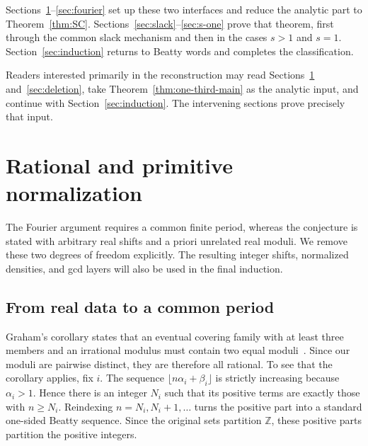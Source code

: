 \documentclass[11pt]{article}
\theoremstyle{definition}
\theoremstyle{remark}
\newcommand{\Z}{\mathbb Z}
\begin{document}
Sections~\ref{sec:normalization}--\ref{sec:fourier} set up these two
interfaces and reduce the analytic part to Theorem~\ref{thm:SC}.
Sections~\ref{sec:slack}--\ref{sec:s-one} prove that theorem, first through
the common slack mechanism and then in the cases \(s>1\) and \(s=1\).
Section~\ref{sec:induction} returns to Beatty words and completes the
classification.

Readers interested primarily in the reconstruction may read
Sections~\ref{sec:normalization} and~\ref{sec:deletion}, take
Theorem~\ref{thm:one-third-main} as the analytic input, and continue with
Section~\ref{sec:induction}.  The intervening sections prove precisely that
input.

\section{Rational and primitive normalization}\label{sec:normalization}

The Fourier argument requires a common finite period, whereas the conjecture
is stated with arbitrary real shifts and a priori unrelated real moduli.  We
remove these two degrees of freedom explicitly.  The resulting integer
shifts, normalized densities, and gcd layers will also be used in the final
induction.

\subsection{From real data to a common period}

Graham's corollary states that an eventual covering family with at least
three members and an irrational modulus must contain two equal
moduli~\cite[Corollary, p.~358]{Graham1973}.  Since our moduli are pairwise
distinct, they are therefore all rational.  To see that the corollary
applies, fix \(i\).  The sequence
\(\lfloor n\alpha_i+\beta_i\rfloor\) is strictly increasing because
\(\alpha_i>1\).  Hence there is an integer \(N_i\) such that its positive
terms are exactly those with \(n\ge N_i\).  Reindexing
\(n=N_i,N_i+1,\ldots\) turns the positive part into a standard one-sided
Beatty sequence.  Since the original sets partition \(\Z\), these positive
parts partition the positive integers.
\end{document}
